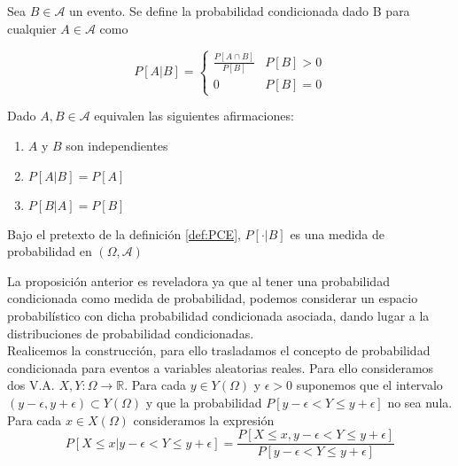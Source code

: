     
    \begin{definicion}\label{def:PCE}
    Sea $B \in \mathcal{A}$ un evento. Se define la probabilidad condicionada dado B para cualquier $A \in \mathcal{A}$ como
    
    $$ P[A|B] = 
        \left\{
            \begin{array}{cc}
                \frac{P[A \cap B]}{P[B]} &  P[B] > 0  \\
                0 & P[B] = 0 
            \end{array} 
        \right.$$
    
    \end{definicion}
      
     \begin{proposicion}{
     Dado $A,B \in \mathcal{A}$ equivalen las siguientes afirmaciones:
     \begin{enumerate}
         \item $A$ y $B$ son independientes
         \item $P[A|B] = P[A]$
         \item $P[B|A] = P[B]$
     \end{enumerate}
     }\end{proposicion}
      
    \begin{proposicion}
    Bajo el pretexto de la definición \ref{def:PCE}, $P[\cdot | B]$ es una medida de probabilidad en $(\Omega,\mathcal{A})$
    \end{proposicion}

    La proposición anterior es reveladora ya que al tener una probabilidad condicionada como medida de probabilidad, podemos considerar un espacio probabilístico con dicha probabilidad condicionada asociada, dando lugar a la distribuciones de probabilidad condicionadas. \\
    
    Realicemos la construcción, para ello trasladamos el concepto de probabilidad condicionada para eventos a variables aleatorias reales. Para ello consideramos dos V.A. $X,Y:\Omega \to \mathbb{R}$. Para cada $y \in Y(\Omega)$ y $\epsilon > 0$ suponemos que el intervalo $(y-\epsilon,y+\epsilon) \subset Y(\Omega)$ y que la probabilidad $P[y-\epsilon < Y \leq y+\epsilon]$ no sea nula. Para cada $x \in X(\Omega)$ consideramos la expresión 
    $$ P[X \leq x | y - \epsilon < Y \leq y + \epsilon] = \frac{P[X \leq x , y - \epsilon < Y \leq y + \epsilon]}{P[y-\epsilon < Y \leq y+\epsilon]} $$
    
